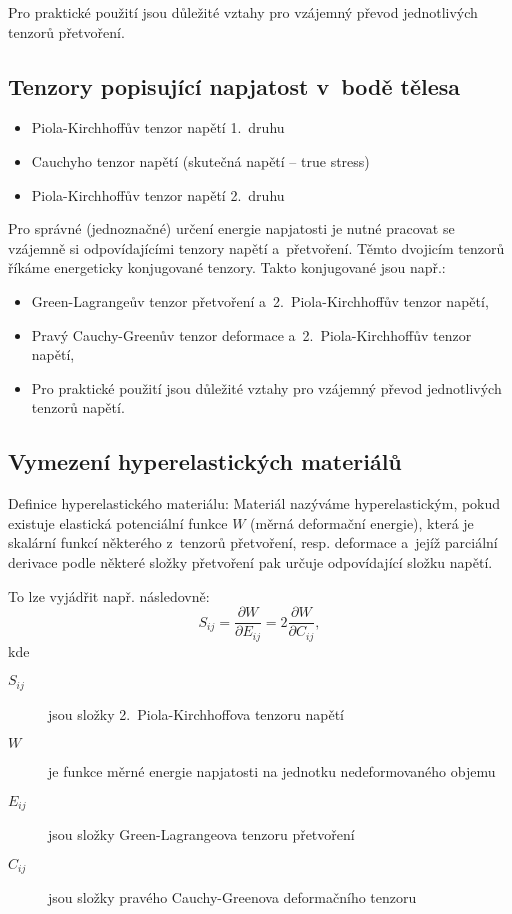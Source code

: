 Pro praktické použití jsou důležité vztahy pro vzájemný převod jednotlivých tenzorů přetvoření.

\subsection{Tenzory popisující napjatost v~bodě tělesa}
\begin{itemize}
	\item Piola-Kirchhoffův tenzor napětí 1.~druhu
	\item Cauchyho tenzor napětí (skutečná napětí -- true stress)
	\item Piola-Kirchhoffův tenzor napětí 2.~druhu
\end{itemize}

Pro správné (jednoznačné) určení energie napjatosti je nutné pracovat se vzájemně si odpovídajícími tenzory napětí a~přetvoření.
Těmto dvojicím tenzorů říkáme energeticky konjugované tenzory.
Takto konjugované jsou např.:
\begin{itemize}
	\item Green-Lagrangeův tenzor přetvoření a~2.~Piola-Kirchhoffův tenzor napětí,
	\item Pravý Cauchy-Greenův tenzor deformace a~2.~Piola-Kirchhoffův tenzor napětí,
	\item Pro praktické použití jsou důležité vztahy pro vzájemný převod jednotlivých tenzorů napětí.
\end{itemize}

\subsection{Vymezení hyperelastických materiálů}
Definice hyperelastického materiálu:
Materiál nazýváme hyperelastickým, pokud existuje elastická potenciální funkce $W$ (měrná deformační energie), která je skalární funkcí některého z~tenzorů přetvoření, resp. deformace a~jejíž parciální derivace podle některé složky přetvoření pak určuje odpovídající složku napětí.

To lze vyjádřit např. následovně:
\begin{equation}
	S_{ij} = \frac{\partial W}{\partial E_{ij}} = 2 \frac{\partial W}{\partial C_{ij}},
\end{equation}
kde
\begin{description}
	\item[$S_{ij}$] jsou složky 2.~Piola-Kirchhoffova tenzoru napětí
	\item[$W$] je funkce měrné energie napjatosti na jednotku nedeformovaného objemu
	\item[$E_{ij}$] jsou složky Green-Lagrangeova tenzoru přetvoření
	\item[$C_{ij}$] jsou složky pravého Cauchy-Greenova deformačního tenzoru
\end{description}

